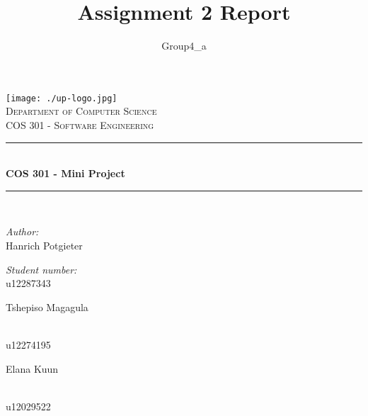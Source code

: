 \documentclass[a4paper,12pt]{report}
\author{Group4_a}
\title{ Assignment 2 Report}
\newcommand{\HRule}{\rule{\linewidth}{0.5mm}}
\begin{document}
\setlength{\parskip}{6pt}

\begin{titlepage}

\begin{center}
\texttt{[image: ./up-logo.jpg]}\\[0.4cm]    
\textsc{\LARGE Department of Computer Science}\\[1.5cm]
\textsc{\Large COS 301 - Software Engineering}\\[0.5cm]
\HRule \\[0.4cm]
{ \huge \bfseries COS 301 - Mini Project}\\[0.4cm]
\HRule \\[0.4cm]
\begin{minipage}{0.4\textwidth}
\begin{flushleft} \large
\emph{Author:}\\
Hanrich {Potgieter}
\end{flushleft}
\end{minipage}
\begin{minipage}{0.4\textwidth}
\begin{flushright} \large
\emph{Student number:} \\
u12287343
\end{flushright}
\end{minipage}
\begin{minipage}{0.4\textwidth}
\begin{flushleft} \large
Tshepiso {Magagula}
\end{flushleft}
\end{minipage}
\begin{minipage}{0.4\textwidth}
\begin{flushright} \large
\emph{} \\
u12274195
\end{flushright}
\end{minipage}
\begin{minipage}{0.4\textwidth}
\begin{flushleft} \large
Elana {Kuun}
\end{flushleft}
\end{minipage}
\begin{minipage}{0.4\textwidth}
\begin{flushright} \large
\emph{} \\
u12029522
\end{flushright}
\end{minipage}

\end{center}
\end{titlepage}
\end{document}
